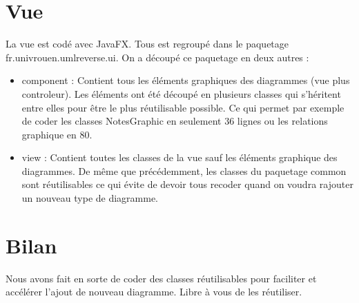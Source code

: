 \documentclass[hidelinks, 10pt,a4paper]{article}
\begin{document}
\section{Vue}
  La vue est codé avec JavaFX. Tous est regroupé dans le paquetage fr.univrouen.umlreverse.ui. On a découpé ce paquetage en deux autres :
  \begin{itemize}
   \item component : Contient tous les éléments graphiques des diagrammes (vue plus controleur). Les éléments ont été découpé en plusieurs classes qui s'héritent
    entre elles pour être le plus réutilisable possible. Ce qui permet par exemple de coder les classes NotesGraphic en seulement 36 lignes ou les relations graphique en 80. 
   \item view : Contient toutes les classes de la vue sauf les éléments graphique des diagrammes. De même que précédemment, les classes du paquetage common sont
    réutilisables ce qui évite de devoir tous recoder quand on voudra rajouter un nouveau type de diagramme.
  \end{itemize}

\section{Bilan}
  Nous avons fait en sorte de coder des classes réutilisables pour faciliter et accélérer l'ajout de nouveau diagramme. 
  Libre à vous de les réutiliser.
  
\end{document}
